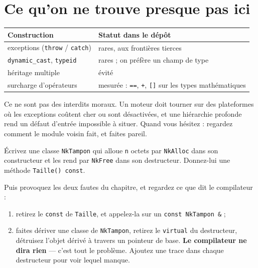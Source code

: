 \section{Ce qu'on ne trouve presque pas ici}

\begin{center}
\begin{tabular}{@{}ll@{}}
\toprule
\textbf{Construction} & \textbf{Statut dans le dépôt} \\
\midrule
exceptions (\texttt{throw} / \texttt{catch}) & rares, aux frontières tierces \\
\texttt{dynamic\_cast}, \texttt{typeid} & rares ; on préfère un champ de type \\
héritage multiple & évité \\
surcharge d'opérateurs & mesurée : \texttt{==}, \texttt{+}, \texttt{[]} sur les types mathématiques \\
\bottomrule
\end{tabular}
\end{center}

\begin{nkretenir}
Ce ne sont pas des interdits moraux. Un moteur doit tourner sur des plateformes
où les exceptions coûtent cher ou sont désactivées, et une hiérarchie profonde
rend un défaut d'entrée impossible à situer. Quand vous hésitez : regardez
comment le module voisin fait, et faites pareil.
\end{nkretenir}

\begin{nkpratique}
Écrivez une classe \texttt{NkTampon} qui alloue \texttt{n} octets par
\texttt{NkAlloc} dans son constructeur et les rend par \texttt{NkFree} dans son
destructeur. Donnez-lui une méthode \texttt{Taille() const}.

Puis provoquez les deux fautes du chapitre, et regardez ce que dit le
compilateur :

\begin{enumerate}
\item retirez le \texttt{const} de \texttt{Taille}, et appelez-la sur un
      \texttt{const NkTampon \&} ;
\item faites dériver une classe de \texttt{NkTampon}, retirez le \texttt{virtual}
      du destructeur, détruisez l'objet dérivé à travers un pointeur de base.
      \textbf{Le compilateur ne dira rien} --- c'est tout le problème. Ajoutez une
      trace dans chaque destructeur pour voir lequel manque.
\end{enumerate}
\end{nkpratique}

